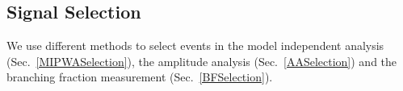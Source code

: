 \subsection{Signal Selection}
\par{


    We use different methods to select events in the model independent analysis (Sec.~\ref{MIPWASelection}), the amplitude analysis (Sec.~\ref{AASelection}) and the branching fraction measurement (Sec.~\ref{BFSelection}).
}




